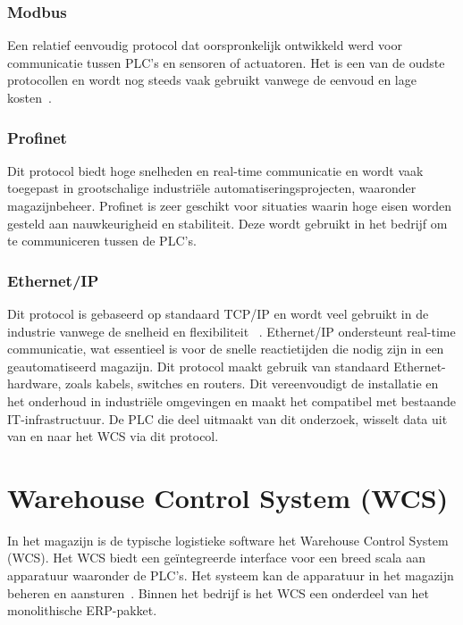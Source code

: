 \subsubsection{Modbus}
Een relatief eenvoudig protocol dat oorspronkelijk ontwikkeld werd voor communicatie tussen PLC’s en sensoren of actuatoren. 
Het is een van de oudste protocollen en wordt nog steeds vaak gebruikt vanwege de eenvoud en lage kosten~\autocite{Joshi2024}. 

\subsubsection{Profinet}
Dit protocol biedt hoge snelheden en real-time communicatie 
en wordt vaak toegepast in grootschalige industriële automatiseringsprojecten, waaronder magazijnbeheer. 
Profinet is zeer geschikt voor situaties waarin hoge eisen worden gesteld aan nauwkeurigheid en stabiliteit.
Deze wordt gebruikt in het bedrijf om te communiceren tussen de PLC's.

\subsubsection{Ethernet/IP}
Dit protocol is gebaseerd op standaard TCP/IP en wordt veel gebruikt in de industrie vanwege de snelheid en flexibiliteit ~\autocite{Joshi2024}. 
Ethernet/IP ondersteunt real-time communicatie, wat essentieel is voor de snelle reactietijden die nodig zijn in een geautomatiseerd magazijn.
Dit protocol maakt gebruik van standaard Ethernet-hardware, zoals kabels, switches en routers. 
Dit vereenvoudigt de installatie en het onderhoud in industriële omgevingen en maakt het compatibel met bestaande IT-infrastructuur.
De PLC die deel uitmaakt van dit onderzoek, wisselt data uit van en naar het WCS via dit protocol.

\section{Warehouse Control System (WCS)} 
In het magazijn is de typische logistieke software het Warehouse Control System (WCS). 
Het WCS biedt een geïntegreerde interface voor een breed scala aan apparatuur waaronder de PLC's. 
Het systeem kan de apparatuur in het magazijn beheren en aansturen~\autocite{Son2015}. 
Binnen het bedrijf is het WCS een onderdeel van het monolithische ERP-pakket.

